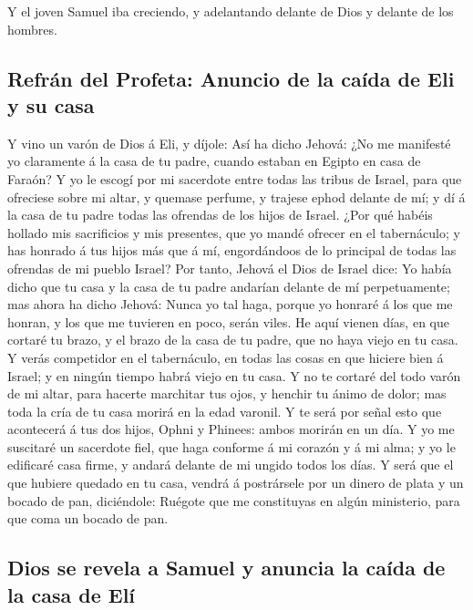  Y el joven Samuel iba creciendo, y adelantando delante de
Dios y delante de los hombres.

\hypertarget{refruxe1n-del-profeta-anuncio-de-la-cauxedda-de-eli-y-su-casa}{%
\subsection{Refrán del Profeta: Anuncio de la caída de Eli y su
casa}\label{refruxe1n-del-profeta-anuncio-de-la-cauxedda-de-eli-y-su-casa}}

 Y vino un varón de Dios á Eli, y díjole: Así ha dicho
Jehová: ¿No me manifesté yo claramente á la casa de tu padre, cuando
estaban en Egipto en casa de Faraón?  Y yo le escogí por mi
sacerdote entre todas las tribus de Israel, para que ofreciese sobre mi
altar, y quemase perfume, y trajese ephod delante de mí; y dí á la casa
de tu padre todas las ofrendas de los hijos de Israel. 
¿Por qué habéis hollado mis sacrificios y mis presentes, que yo mandé
ofrecer en el tabernáculo; y has honrado á tus hijos más que á mí,
engordándoos de lo principal de todas las ofrendas de mi pueblo Israel?
 Por tanto, Jehová el Dios de Israel dice: Yo había dicho
que tu casa y la casa de tu padre andarían delante de mí perpetuamente;
mas ahora ha dicho Jehová: Nunca yo tal haga, porque yo honraré á los
que me honran, y los que me tuvieren en poco, serán viles. 
He aquí vienen días, en que cortaré tu brazo, y el brazo de la casa de
tu padre, que no haya viejo en tu casa.  Y verás competidor
en el tabernáculo, en todas las cosas en que hiciere bien á Israel; y en
ningún tiempo habrá viejo en tu casa.  Y no te cortaré del
todo varón de mi altar, para hacerte marchitar tus ojos, y henchir tu
ánimo de dolor; mas toda la cría de tu casa morirá en la edad varonil.
 Y te será por señal esto que acontecerá á tus dos hijos,
Ophni y Phinees: ambos morirán en un día.  Y yo me
suscitaré un sacerdote fiel, que haga conforme á mi corazón y á mi alma;
y yo le edificaré casa firme, y andará delante de mi ungido todos los
días.  Y será que el que hubiere quedado en tu casa, vendrá
á postrársele por un dinero de plata y un bocado de pan, diciéndole:
Ruégote que me constituyas en algún ministerio, para que coma un bocado
de pan.

\hypertarget{dios-se-revela-a-samuel-y-anuncia-la-cauxedda-de-la-casa-de-eluxed}{%
\subsection{Dios se revela a Samuel y anuncia la caída de la casa de
Elí}\label{dios-se-revela-a-samuel-y-anuncia-la-cauxedda-de-la-casa-de-eluxed}}


